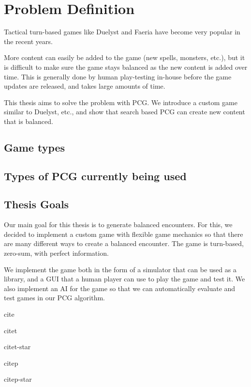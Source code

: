 \chapter{Problem Definition}

Tactical turn-based games like Duelyst and Faeria 
have become very popular in the recent years.

More content can easily be added to the game (new spells, monsters, etc.),
but it is difficult to make sure the game stays balanced as the new content
is added over time. This is generally done by human play-testing 
in-house before the game updates are released, and takes large amounts of time.

This thesis aims to solve the problem with PCG. We introduce a custom
game similar to Duelyst, etc., and show that search based PCG can create
new content that is balanced.

\section{Game types}

\section{Types of PCG currently being used}

\section{Thesis Goals}

Our main goal for this thesis is to generate balanced encounters. For this, we decided
to implement a custom game with flexible game mechanics so that there are many different
ways to create a balanced encounter. The game is turn-based, zero-sum, with perfect information.

We implement the game both in the form of a simulator that can be used as a library,
and a GUI that a human player can use to play the game and test it. We also implement
an AI for the game so that we can automatically evaluate and test games in our PCG algorithm.


cite \cite{Genberget08}

citet \citet{Genberget08}

citet-star \citet*{Genberget08}

citep \citep{Genberget08}

citep-star \citep*{Genberget08}

